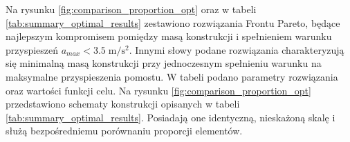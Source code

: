 Na rysunku \ref{fig:comparison_proportion_opt} oraz w tabeli \ref{tab:summary_optimal_results} zestawiono rozwiązania Frontu Pareto, będące najlepszym kompromisem pomiędzy masą konstrukcji i spełnieniem warunku przyspieszeń $a_{max}<3.5\;\mathrm{m/s^2}$. Innymi słowy podane rozwiązania charakteryzują się minimalną masą konstrukcji przy jednoczesnym spełnieniu warunku na maksymalne przyspieszenia pomostu. W tabeli podano parametry rozwiązania oraz wartości funkcji celu. Na rysunku \ref{fig:comparison_proportion_opt} przedstawiono schematy konstrukcji opisanych w tabeli \ref{tab:summary_optimal_results}. Posiadają one identyczną, nieskażoną skalę i służą bezpośredniemu porównaniu proporcji elementów.






